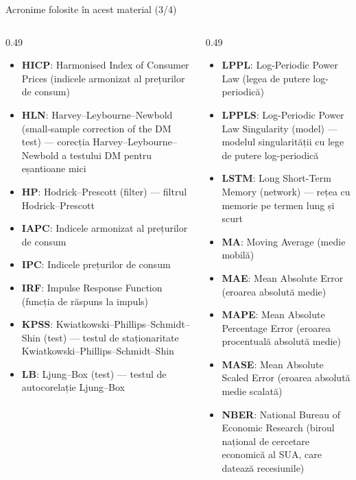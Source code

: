 \begin{frame}{Acronime folosite în acest material (3/4)}
\begin{columns}[T]
\begin{column}{0.49\textwidth}
\begin{itemize}\setlength{\itemsep}{0pt}
    \item \textbf{HICP}: Harmonised Index of Consumer Prices (indicele armonizat al prețurilor de consum)
    \item \textbf{HLN}: Harvey–Leybourne–Newbold (small-sample correction of the DM test) — corecția Harvey–Leybourne–Newbold a testului DM pentru eșantioane mici
    \item \textbf{HP}: Hodrick–Prescott (filter) — filtrul Hodrick–Prescott
    \item \textbf{IAPC}: Indicele armonizat al prețurilor de consum
    \item \textbf{IPC}: Indicele prețurilor de consum
    \item \textbf{IRF}: Impulse Response Function (funcția de răspuns la impuls)
    \item \textbf{KPSS}: Kwiatkowski–Phillips–Schmidt–Shin (test) — testul de staționaritate Kwiatkowski–Phillips–Schmidt–Shin
    \item \textbf{LB}: Ljung–Box (test) — testul de autocorelație Ljung–Box
\end{itemize}
\end{column}
\begin{column}{0.49\textwidth}
\begin{itemize}\setlength{\itemsep}{0pt}
    \item \textbf{LPPL}: Log-Periodic Power Law (legea de putere log-periodică)
    \item \textbf{LPPLS}: Log-Periodic Power Law Singularity (model) — modelul singularității cu lege de putere log-periodică
    \item \textbf{LSTM}: Long Short-Term Memory (network) — rețea cu memorie pe termen lung și scurt
    \item \textbf{MA}: Moving Average (medie mobilă)
    \item \textbf{MAE}: Mean Absolute Error (eroarea absolută medie)
    \item \textbf{MAPE}: Mean Absolute Percentage Error (eroarea procentuală absolută medie)
    \item \textbf{MASE}: Mean Absolute Scaled Error (eroarea absolută medie scalată)
    \item \textbf{NBER}: National Bureau of Economic Research (biroul național de cercetare economică al SUA, care datează recesiunile)
\end{itemize}
\end{column}
\end{columns}
\end{frame}
